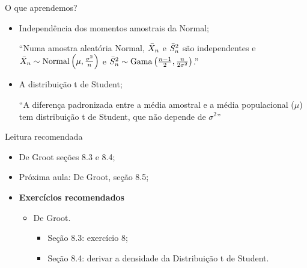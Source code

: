 \begin{frame}{O que aprendemos?}
\begin{itemize}

  \item[\faLightbulbO] Independência dos momentos amostrais da Normal;    
  
   ``Numa amostra aleatória Normal, $\bar{X}_n$ e $\bar{S}^2_n$ são independentes e $\bar{X}_n \sim \operatorname{Normal}\left(\mu, \frac{\sigma^2}{n}\right)$ e $\bar{S}^2_n \sim \operatorname{Gama}\left(\frac{n-1}{2},  \frac{n}{2\sigma^2}\right)$.''  
     
   \item[\faLightbulbO] A distribuição t de Student;
   
   ``A diferença padronizada entre a média amostral e a média populacional ($\mu$) tem distribuição t de Student, que não depende de $\sigma^2$''
    
  \end{itemize}
 \end{frame}

\begin{frame}{Leitura recomendada}
\begin{itemize}
 \item[\faBook] De Groot seções 8.3 e 8.4;
 \item[\faForward] Próxima aula: De Groot, seção 8.5;
 \item {\large\textbf{Exercícios recomendados}}
 \begin{itemize}
  \item[\faBookmark] De Groot.
  \begin{itemize}
   \item Seção 8.3: exercício 8;
   \item Seção 8.4: derivar a densidade da Distribuição t de Student.
  \end{itemize}   
  \end{itemize}
 \end{itemize} 
\end{frame}

